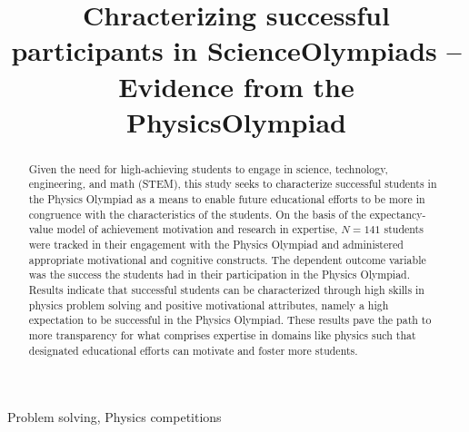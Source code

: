\documentclass[]{interact}
\begin{document}

\title{Chracterizing successful participants in ScienceOlympiads -- Evidence from the PhysicsOlympiad}

\author{
}

\maketitle

\begin{abstract}
Given the need for high-achieving students to engage in science, technology, engineering, and math (STEM), this study seeks to characterize successful students in the Physics Olympiad as a means to enable future educational efforts to be more in congruence with the characteristics of the students. On the basis of the expectancy-value model of achievement motivation and research in expertise, $N=141$ students were tracked in their engagement with the Physics Olympiad and administered appropriate motivational and cognitive constructs. The dependent outcome variable was the success the students had in their participation in the Physics Olympiad. Results indicate that successful students can be characterized through high skills in physics problem solving and positive motivational attributes, namely a high expectation to be successful in the Physics Olympiad. These results pave the path to more transparency for what comprises expertise in domains like physics such that designated educational efforts can motivate and foster more students.
\end{abstract}

\begin{keywords}
Problem solving, Physics competitions
\end{keywords}

\maketitle
\end{document}
